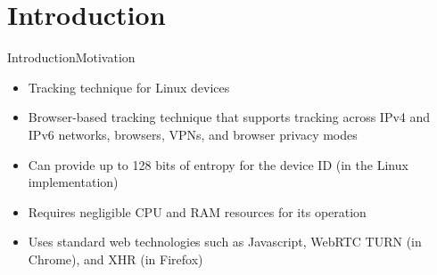 \documentclass[a4paper]{article}
\begin{document}
%

\setcounter{section}{0}

\section{Introduction}

\begin{frame}[fragile]{Introduction}{Motivation}
	\begin{itemize}
		\item Tracking technique for Linux devices
		\item Browser-based tracking technique that supports tracking across IPv4 and IPv6 networks, browsers, VPNs, and browser privacy modes
		\item Can provide up to 128 bits of entropy for the device ID (in the Linux implementation)
		\item Requires negligible CPU and RAM resources for its operation
		\item Uses standard web technologies such as Javascript, WebRTC TURN (in Chrome), and XHR (in Firefox)
	\end{itemize}
\end{frame}
\end{document}
